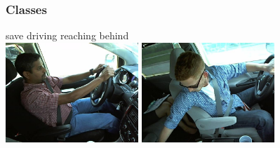 \documentclass{beamer}
\begin{document}
	\begin{frame}
        \frametitle{Classes}
		\begin{center}
            save driving \quad \quad \quad \quad \quad \quad \quad reaching behind\\
			\includegraphics[width=5cm]{img_34} \vspace{0.1cm}
			\includegraphics[width=5cm]{img_81} 
		\end{center}
	\end{frame}
\end{document}
